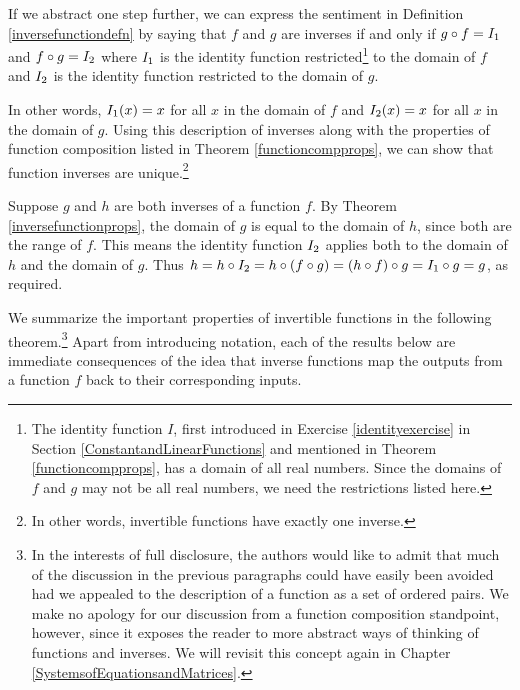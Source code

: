 \documentclass{ximera}
\begin{document}
\smallskip

If we abstract one step further, we can express the sentiment in Definition \ref{inversefunctiondefn} by saying that $f$ and $g$ are inverses if and only if  $g \circ f = I_{\text{\scriptsize $1$}}$ and $f \circ g = I_{\text{\scriptsize $2$}}$ where $I_{\text{\scriptsize $1$}}$ is the identity function restricted\footnote{The identity function $I$, first introduced in Exercise \ref{identityexercise} in Section \ref{ConstantandLinearFunctions} and mentioned in Theorem \ref{functioncompprops}, has a domain of all real numbers.  Since the domains of $f$ and $g$ may not be all real numbers, we need the restrictions listed here.} to the domain of $f$ and $I_{\text{\scriptsize $2$}}$ is the identity function restricted to the domain of $g$.  

\smallskip

In other words, $I_{\text{\scriptsize $1$}}(x) = x$ for all $x$ in the domain of $f$ and $I_{\text{\scriptsize $2$}}(x) = x$ for all $x$ in the domain of $g$.    Using this description of inverses along with the properties of function composition listed in Theorem  \ref{functioncompprops}, we can show that function inverses are unique.\footnote{In other words, invertible functions have exactly one inverse.}   

\smallskip

Suppose $g$ and $h$ are both inverses of a function $f$. By Theorem \ref{inversefunctionprops}, the domain of $g$ is equal to the domain of $h$, since both are the range of $f$.  This means the identity function $I_{\text{\scriptsize $2$}}$ applies both to the domain of $h$ and the domain of $g$.  Thus $h = h \circ I_{\text{\scriptsize $2$}} = h \circ (f \circ g) = (h \circ f) \circ g = I_{\text{\scriptsize $1$}} \circ g = g$, as required.

\smallskip

We summarize the important properties of invertible functions in the following theorem.\footnote{In the interests of full disclosure, the authors would like to admit that much of the discussion in the previous paragraphs could have easily been avoided had we appealed to the description of a function as a set of ordered pairs.  We make no apology for our discussion from a function composition standpoint, however, since it exposes the reader to more abstract ways of thinking of functions and inverses.  We will revisit this concept again in Chapter \ref{SystemsofEquationsandMatrices}.}  Apart from introducing notation, each of the results below are immediate consequences of the idea that inverse functions map the outputs from a function $f$  back to their corresponding inputs.
\end{document}
